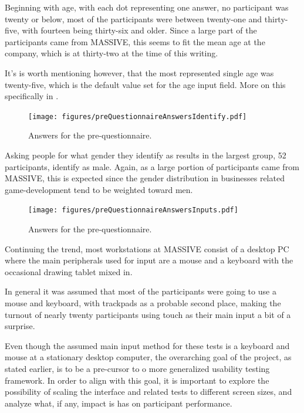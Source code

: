 \documentclass[nofilelist,dvipsnames]{cslthse-msc}
\begin{document}
{        Beginning with age, with each dot representing one answer, no
        participant was twenty or below, most of the  participants were between
        twenty-one and thirty-five, with fourteen being thirty-six and older.
        Since a large part of the participants came from MASSIVE, this seems to
        fit the mean age at the company, which is at thirty-two{\findref} at
        the time of this writing.

        It's is worth mentioning however, that the most represented single age
        was twenty-five, which is the default value set for the age input
        field. More on this specifically in .

				\begin{figure}[h!]
					\centering
					\texttt{[image: figures/preQuestionnaireAnswersIdentify.pdf]}
					\caption{Answers for the pre-questionnaire.}
				\end{figure}

        Asking people for what gender they identify as results in the largest
        group, 52 participants, identify as male. Again, as a large portion of
        participants came from MASSIVE, this is expected since the gender
        distribution in businesses related game-development tend to be weighted
        toward men\findref\findref.

				\begin{figure}[h!]
					\centering
					\texttt{[image: figures/preQuestionnaireAnswersInputs.pdf]}
					\caption{Answers for the pre-questionnaire.}
				\end{figure}

        Continuing the trend, most workstations at MASSIVE consist of a
        desktop PC where the main peripherals used for input are a mouse and a
        keyboard with the occasional drawing tablet mixed in.

        In general it was assumed that most of the participants were going to
        use a mouse and keyboard, with trackpads as a probable second place,
        making the turnout of nearly twenty participants using touch as their
        main input a bit of a surprise.

        Even though the assumed main input method for these tests is a keyboard
        and mouse at a stationary desktop computer, the overarching goal of the
        project, as stated earlier, is to be a pre-cursor to o more generalized
        usability testing framework. In order to align with this goal, it is
        important to explore the possibility of scaling the interface and
        related tests to different screen sizes, and analyze what, if any,
        impact is has on participant performance.

}
\end{document}

